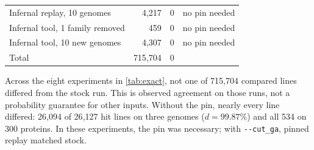 \documentclass[letterpaper,twocolumn,10pt]{article}
\theoremstyle{definition}
\newcommand{\cutga}{\texttt{-{}-cut\_ga}\xspace}
\begin{document}
\begin{table}[t]
\begin{tabular}{@{}lrcr@{}}
Infernal replay, 10 genomes & 4{,}217 & 0 & no pin needed \\
Infernal tool, 1 family removed & 459 & 0 & no pin needed \\
Infernal tool, 10 new genomes & 4{,}307 & 0 & no pin needed \\
\midrule
Total & 715{,}704 & 0 & \\
\bottomrule
\end{tabular}
\end{table}

Across the eight experiments in \cref{tab:exact}, not one of 715{,}704 compared lines differed from the stock run.
This is observed agreement on those runs, not a probability guarantee for other inputs.
Without the pin, nearly every line differed: 26{,}094 of 26{,}127 hit lines on three genomes ($d = 99.87\%$)
and all 534 on 300 proteins. In these experiments, the pin was necessary; with \cutga, pinned replay matched stock.
\end{document}
